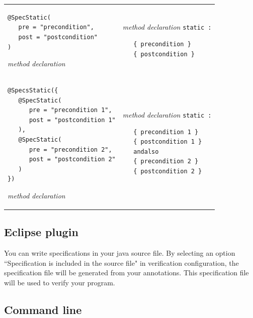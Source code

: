 \documentclass{article}
\begin{document}
\begin{longtable}{ m{7cm} | m{5cm} }
\begin{verbatim}
@SpecStatic(
   pre = "precondition", 
   post = "postcondition"
)
\end{verbatim}
\it{method declaration}
&
{\it method declaration} \texttt{static :}
\begin{verbatim}
   { precondition }
   { postcondition }
\end{verbatim}
\\
\begin{verbatim}
@SpecsStatic({
   @SpecStatic(
      pre = "precondition 1", 
      post = "postcondition 1"
   ),
   @SpecStatic(
      pre = "precondition 2", 
      post = "postcondition 2"
   )
})
\end{verbatim}
\it{method declaration}
&
{\it method declaration} \texttt{static :}
\begin{verbatim}
   { precondition 1 }
   { postcondition 1 }
   andalso
   { precondition 2 }
   { postcondition 2 }
\end{verbatim}
\end{longtable}

\subsection*{Eclipse plugin}

You can write specifications in your java source file. By selecting an option ``Specification is included in the source file" in verification configuration, the specification file will be generated from your annotations. This specification file will be used to verify your program.

\subsection*{Command line}
\end{document}
